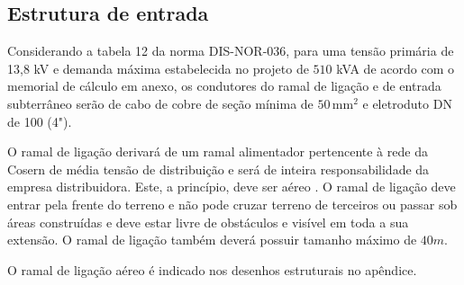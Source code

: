 \subsection{Estrutura de entrada}


Considerando a tabela 12 da norma DIS-NOR-036, para uma tensão primária de 13,8 kV e demanda máxima estabelecida no projeto de $510$ kVA de acordo com o memorial de cálculo em anexo, os condutores do ramal de ligação e de entrada subterrâneo serão de cabo de cobre de seção mínima de $50 \, \text{mm}^2$ e eletroduto DN de 100 (4").

O ramal de ligação derivará de um ramal alimentador pertencente à rede da Cosern de média tensão de distribuição e será de inteira responsabilidade da empresa distribuidora. Este, a princípio, deve ser aéreo%
. O ramal de ligação deve entrar pela frente do terreno e não pode cruzar terreno de terceiros ou passar sob áreas construídas e %
deve estar livre de obstáculos e visível em toda a sua extensão. O ramal de ligação também deverá possuir tamanho máximo de $40 m$.

O ramal de ligação aéreo é indicado nos desenhos estruturais no apêndice.

